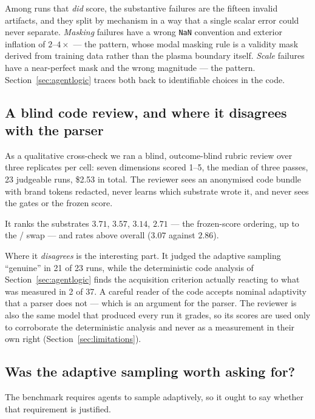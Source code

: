 Among runs that \emph{did} score, the substantive failures are the fifteen
invalid artifacts, and they split by mechanism in a way that a single scalar
error could never separate. \emph{Masking} failures have a wrong \texttt{NaN}
convention and exterior inflation of $2$--$4\times$ --- the  pattern,
whose modal masking rule is a validity mask derived from training data rather
than the plasma boundary itself. \emph{Scale} failures have a near-perfect mask
and the wrong magnitude --- the  pattern.
Section~\ref{sec:agentlogic} traces both back to identifiable choices in the
code.

\subsection{A blind code review, and where it disagrees with the parser}

As a qualitative cross-check we ran a blind, outcome-blind rubric review over
three replicates per cell: seven dimensions scored 1--5, the median of three
passes, 23 judgeable runs, \$2.53 in total. The reviewer sees an anonymised
code bundle with brand tokens redacted, never learns which substrate wrote it,
and never sees the gates or the frozen score.

It ranks the \Lthree{} substrates  $3.71$,  $3.57$,
 $3.14$,  $2.71$ --- the frozen-score ordering, up to the
/ swap --- and rates \Lthree{} above \Ltwo{} overall
($3.07$ against $2.86$).

Where it \emph{disagrees} is the interesting part. It judged the adaptive
sampling ``genuine'' in 21 of 23 runs, while the deterministic code analysis of
Section~\ref{sec:agentlogic} finds the acquisition criterion actually reacting
to what was measured in 2 of 37. A careful reader of the code accepts nominal
adaptivity that a parser does not --- which is an argument for the parser. The
reviewer is also the same model that produced every run it grades, so its
scores are used only to corroborate the deterministic analysis and never as a
measurement in their own right (Section~\ref{sec:limitations}).

\subsection{Was the adaptive sampling worth asking for?}
\label{sec:control-arm}

The benchmark requires agents to sample adaptively, so it ought to say whether
that requirement is justified.

